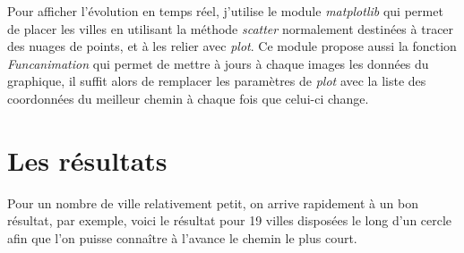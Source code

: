 \documentclass[12pt]{article}
\begin{document}
Pour afficher l'évolution en temps réel, j'utilise le module \emph{matplotlib} qui permet de placer les villes en utilisant la méthode
\emph{scatter} normalement destinées à tracer des nuages de points, et à les relier avec \emph{plot}. Ce module propose aussi la fonction
\emph{Funcanimation} qui permet de mettre à jours à chaque images les données du graphique, il suffit alors de remplacer les paramètres
de \emph{plot} avec la liste des coordonnées du meilleur chemin à chaque fois que celui-ci change.

\section{Les résultats}
\label{sec-3}

Pour un nombre de ville relativement petit, on arrive rapidement à un bon résultat, par exemple, voici le résultat pour 19 villes disposées
le long d'un cercle afin que l'on puisse connaître à l'avance le chemin le plus court.
\end{document}
